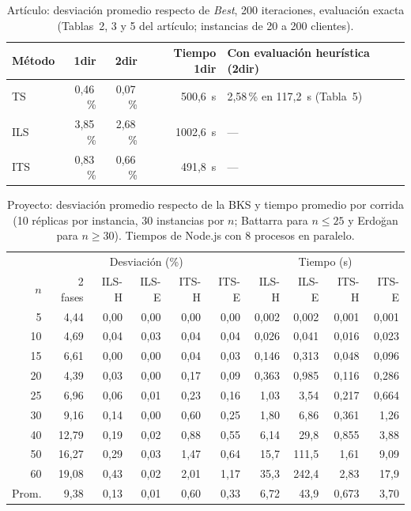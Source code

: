 \documentclass{article}
\begin{document}
\begin{table}[H]\centering\small
\caption{Artículo: desviación promedio respecto de \emph{Best}, 200 iteraciones, evaluación exacta (Tablas~2, 3 y 5 del artículo; instancias de 20 a 200 clientes).}
\renewcommand{\arraystretch}{1.25}
\begin{tabular}{l r r r l}
\toprule
\rowcolor{papel} Método & 1dir & 2dir & Tiempo 1dir & Con evaluación heurística (2dir) \\
\midrule
TS  & 0,46\,\% & 0,07\,\% & 500,6~s & 2,58\,\% en 117,2~s (Tabla~5) \\
ILS & 3,85\,\% & 2,68\,\% & 1002,6~s & --- \\
ITS & 0,83\,\% & 0,66\,\% & 491,8~s & --- \\
\bottomrule
\end{tabular}
\end{table}

\begin{table}[H]\centering\small
\caption{Proyecto: desviación promedio respecto de la BKS y tiempo promedio por corrida (10 réplicas por instancia, 30 instancias por $n$; Battarra para $n \le 25$ y Erdoğan para $n \ge 30$). Tiempos de Node.js con 8 procesos en paralelo.}
\renewcommand{\arraystretch}{1.2}
\setlength{\tabcolsep}{4.5pt}
\begin{tabular}{r r r r r r @{\hspace{14pt}} r r r r}
\toprule
\rowcolor{papel} & \multicolumn{5}{c}{Desviación (\%)} & \multicolumn{4}{c}{Tiempo (s)} \\
\rowcolor{papel} $n$ & 2 fases & ILS-H & ILS-E & ITS-H & ITS-E & ILS-H & ILS-E & ITS-H & ITS-E \\
\midrule
5  & 4,44  & 0,00 & 0,00 & 0,00 & 0,00 & 0,002 & 0,002 & 0,001 & 0,001 \\
10 & 4,69  & 0,04 & 0,03 & 0,04 & 0,04 & 0,026 & 0,041 & 0,016 & 0,023 \\
15 & 6,61  & 0,00 & 0,00 & 0,04 & 0,03 & 0,146 & 0,313 & 0,048 & 0,096 \\
20 & 4,39  & 0,03 & 0,00 & 0,17 & 0,09 & 0,363 & 0,985 & 0,116 & 0,286 \\
25 & 6,96  & 0,06 & 0,01 & 0,23 & 0,16 & 1,03  & 3,54  & 0,217 & 0,664 \\
30 & 9,16  & 0,14 & 0,00 & 0,60 & 0,25 & 1,80  & 6,86  & 0,361 & 1,26 \\
40 & 12,79 & 0,19 & 0,02 & 0,88 & 0,55 & 6,14  & 29,8  & 0,855 & 3,88 \\
50 & 16,27 & 0,29 & 0,03 & 1,47 & 0,64 & 15,7  & 111,5 & 1,61  & 9,09 \\
60 & 19,08 & 0,43 & 0,02 & 2,01 & 1,17 & 35,3  & 242,4 & 2,83  & 17,9 \\
\midrule
Prom. & 9,38 & 0,13 & 0,01 & 0,60 & 0,33 & 6,72 & 43,9 & 0,673 & 3,70 \\
\bottomrule
\end{tabular}
\end{table}
\end{document}
